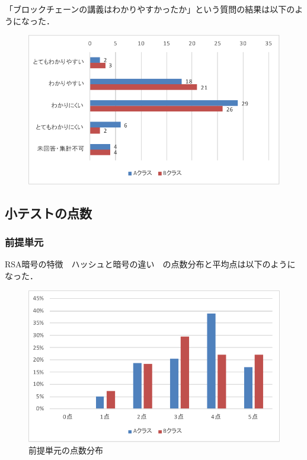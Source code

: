 \documentclass[a4j,12pt]{jsarticle}
\begin{document}
「ブロックチェーンの講義はわかりやすかったか」という質問の結果は以下のようになった．
\begin{figure}[H]
\centering
\includegraphics[width=12cm]{ankb1.pdf}
\label{fig:time}
\end{figure}





\newpage
\subsection{小テストの点数}
\subsubsection{前提単元}
RSA暗号の特徴　ハッシュと暗号の違い　の点数分布と平均点は以下のようになった．

\begin{figure}[H]
\centering
\includegraphics[width=12cm]{12test.pdf}
\caption{前提単元の点数分布}
\label{fig:no}
\end{figure} 
\end{document}
